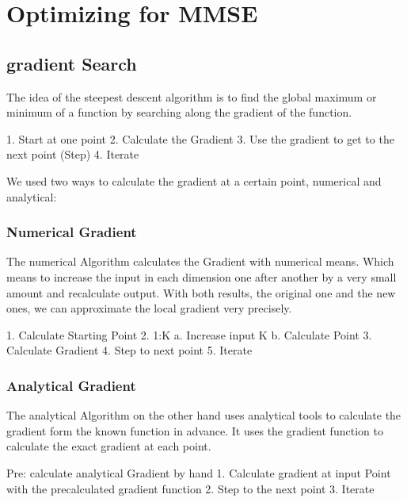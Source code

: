 \section{Optimizing for MMSE}
\subsection{gradient Search}

The idea of the steepest descent algorithm is to find the global maximum or minimum of a function by searching along the gradient of the function.
\begin{algorithm}
	1.	Start at one point
	2.	Calculate the Gradient
	3.	Use the gradient to get to the next point (Step)
	4.	Iterate
\end{algorithm}
We used two ways to calculate the gradient at a certain point, numerical and analytical:

\subsubsection{Numerical Gradient}
The numerical Algorithm calculates the Gradient with numerical means. Which means to increase the input in each dimension one after another by a very small amount and recalculate output. With both results, the original one and the new ones, we can approximate the local gradient very precisely.
\begin{algorithm}
	1.	Calculate Starting Point
	2.	1:K 
	a.	Increase input K
	b.	Calculate Point
	3.	Calculate Gradient
	4.	Step to next point
	5.	Iterate
\end{algorithm}
\subsubsection{Analytical Gradient}
The analytical Algorithm on the other hand uses analytical tools to calculate the gradient form the known function in advance. It uses the gradient function to calculate the exact gradient at each point.
\begin{algorithm}
	Pre: calculate analytical Gradient by hand
	1.	Calculate gradient at input Point with the precalculated gradient function
	2.	Step to the next point
	3.	Iterate
\end{algorithm}

